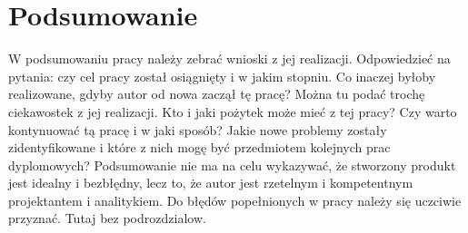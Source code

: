 \chapter{Podsumowanie}
\label{cha:podsumowanie}
W podsumowaniu pracy należy zebrać wnioski z jej realizacji. Odpowiedzieć na pytania: czy
cel pracy został osiągnięty i w jakim stopniu. Co inaczej byłoby realizowane, gdyby autor od
nowa zaczął tę pracę? Można tu podać trochę ciekawostek z jej realizacji. Kto i jaki pożytek
może mieć z tej pracy? Czy warto kontynuować tą pracę i w jaki sposób? Jakie nowe
problemy zostały zidentyfikowane i które z nich mogę być przedmiotem kolejnych prac
dyplomowych? Podsumowanie nie ma na celu wykazywać, że stworzony produkt jest idealny
i bezbłędny, lecz to, że autor jest rzetelnym i kompetentnym projektantem i analitykiem. Do
błędów popełnionych w pracy należy się uczciwie przyznać. \newline
Tutaj bez podrozdzialow.
